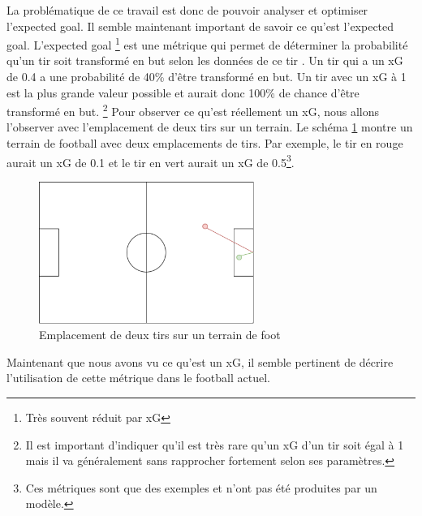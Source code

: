 \documentclass[12pt]{article}
\begin{document}
\noindent La problématique de ce travail est donc de pouvoir analyser et optimiser l'expected goal.
\newline
Il semble maintenant important de savoir ce qu'est l'expected goal. L'expected goal
\footnote{Très souvent réduit par xG} est une métrique qui permet de déterminer la probabilité qu'un tir soit transformé en but selon les données de ce tir \cite{XGExplainedFBrefa}.
Un tir qui a un xG de 0.4 a une probabilité de 40\% d'être transformé en but. Un tir avec un xG à 1 est la plus grande valeur possible et aurait donc 100\% de chance d'être transformé en but.
\footnote{Il est important d'indiquer qu'il est très rare qu'un xG d'un tir soit égal à 1 mais il va généralement sans rapprocher fortement selon ses paramètres.} \cite{pettyWhatExpectedGoals2018a}
\newline
Pour observer ce qu'est réellement un xG, nous allons l'observer avec l'emplacement de deux tirs sur un terrain.
Le schéma \ref{fig:expected_goal_example} montre un terrain de football avec deux emplacements de tirs.
Par exemple, le tir en rouge aurait un xG de 0.1 et le tir en vert aurait un xG de 0.5\footnote{Ces métriques sont que des exemples et n'ont pas été produites par un modèle.}.
\begin{figure}[htp]
    \centering
    \includegraphics[width=7cm]{img/ExplicationXG.png}

    \caption{Emplacement de deux tirs sur un terrain de foot}
    \label{fig:expected_goal_example}
\end{figure}


\noindent Maintenant que nous avons vu ce qu'est un xG, il semble pertinent de décrire l'utilisation de cette métrique dans le football actuel.
\end{document}
